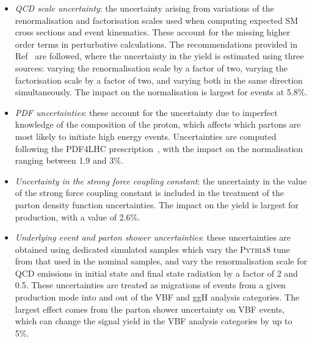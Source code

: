 \begin{itemize}
\item \textit{QCD scale uncertainty}:  
  the uncertainty arising from variations of the renormalisation and factorisation scales used when computing expected SM cross sections and event kinematics.
  These account for the missing higher order terms in perturbative calculations.
  The recommendations provided in Ref~\cite{YR4} are followed, where the uncertainty in the yield is estimated using three sources: varying the renormalisation scale by a factor of two, varying the factorisation scale by a factor of two, and varying both in the same direction simultaneously.
  The impact on the normalisation is largest for \ttH events at 5.8\%. %
\item \textit{PDF uncertainties}:
  these account for the uncertainty due to imperfect knowledge of the composition of the proton, which affects which partons are most likely to initiate high energy events.
  Uncertainties are computed following the PDF4LHC prescription~\cite{PDF4LHC,YR3}, with the impact on the normalisation ranging between 1.9 and 3\%.
\item \textit{Uncertainty in the strong force coupling constant}:
  the uncertainty in the value of the strong force coupling constant is included in the treatment of the parton density function uncertainties.
  The impact on the yield is largest for \ggH production, with a value of 2.6\%.
\item \textit{Underlying event and parton shower uncertainties}:
  these uncertainties are obtained using dedicated simulated samples which vary the \textsc{Pythia8} tune from that used in the nominal samples, and vary the renormalisation scale for QCD emissions in initial state and final state radiation by a factor of 2 and 0.5. These uncertainties are treated as migrations of events from a given production mode into and out of the VBF and ggH analysis categories. The largest effect comes from the parton shower uncertainty on VBF events, which can change the signal yield in the VBF analysis categories by up to 5\%. 
\end{itemize}


